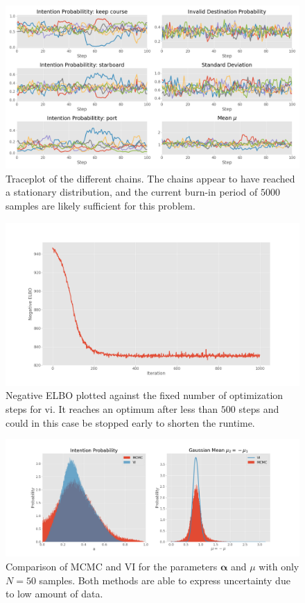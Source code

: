 \begin{figure}[h]
    \centering
    \includegraphics[width=\textwidth]{figures/example_mcmc_trace.png}
    \caption{Traceplot of the different chains. The chains appear to have reached a stationary distribution, and the current burn-in period of $5000$ samples are likely sufficient for this problem.}
    \label{fig:example_mcmc_trace}
\end{figure}

\begin{figure}[h]
    \centering
    \includegraphics[width=\textwidth]{figures/example_vi_losses.png}
    \caption{Negative ELBO plotted against the fixed number of optimization steps for \acrshort{vi}. It reaches an optimum after less than $500$ steps and could in this case be stopped early to shorten the runtime.}
    \label{fig:example_vi_losses}
\end{figure}


\begin{figure}[h]
    \centering
    \includegraphics[width=\textwidth]{figures/example_vi_mcmc_comparison_low_N.png}
    \caption{Comparison of MCMC and VI for the parameters $\boldsymbol{\alpha}$ and $\mu$ with only $N=50$ samples. Both methods are able to express uncertainty due to low amount of data.}
    \label{fig:example_mcmc_vi_low_N}
\end{figure}

